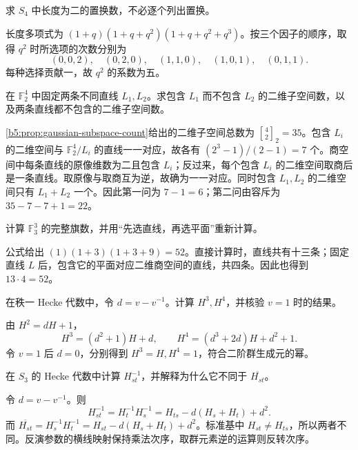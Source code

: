 \begin{exercise}\label{b5:ex:A-length-four-coefficient}
	求 \(S_4\) 中长度为二的置换数，不必逐个列出置换。
\end{exercise}
\begin{solution}
	长度多项式为 \((1+q)(1+q+q^2)(1+q+q^2+q^3)\)。按三个因子的顺序，取得 \(q^2\) 时所选项的次数分别为
	\[
		(0,0,2),\quad(0,2,0),\quad(1,1,0),\quad(1,0,1),\quad(0,1,1).
	\]
	每种选择贡献一，故 \(q^2\) 的系数为五。
\end{solution}

\begin{exercise}\label{b5:ex:A-gaussian-four-two}
	在 \(\mathbb F_2^4\) 中固定两条不同直线 \(L_1,L_2\)。求包含 \(L_1\) 而不包含 \(L_2\) 的二维子空间数，以及两条直线都不包含的二维子空间数。
\end{exercise}
\begin{solution}
	\cref{b5:prop:gaussian-subspace-count}给出的二维子空间总数为 \({4\brack2}_2=35\)。包含 \(L_i\) 的二维空间与 \(\mathbb F_2^4/L_i\) 的直线一一对应，故各有 \((2^3-1)/(2-1)=7\) 个。商空间中每条直线的原像维数为二且包含 \(L_i\)；反过来，每个包含 \(L_i\) 的二维空间取商后是一条直线。取原像与取商互为逆，故确为一一对应。同时包含 \(L_1,L_2\) 的二维空间只有 \(L_1+L_2\) 一个。因此第一问为 \(7-1=6\)；第二问由容斥为 \(35-7-7+1=22\)。
\end{solution}

\begin{exercise}\label{b5:ex:A-flag-three}
	计算 \(\mathbb F_3^3\) 的完整旗数，并用“先选直线，再选平面”重新计算。
\end{exercise}
\begin{solution}
	公式给出 \((1)(1+3)(1+3+9)=52\)。直接计算时，直线共有十三条；固定直线 \(L\) 后，包含它的平面对应二维商空间的直线，共四条。因此也得到 \(13\cdot4=52\)。
\end{solution}

\begin{exercise}\label{b5:ex:A-hecke-rank-one-powers}
	在秩一 Hecke 代数中，令 \(d=v-v^{-1}\)。计算 \(H^3,H^4\)，并核验 \(v=1\) 时的结果。
\end{exercise}
\begin{solution}
	由 \(H^2=dH+1\)，
	\[
		H^3=(d^2+1)H+d,\qquad H^4=(d^3+2d)H+d^2+1.
	\]
	令 \(v=1\) 后 \(d=0\)，分别得到 \(H^3=H,H^4=1\)，符合二阶群生成元的幂。
\end{solution}

\begin{exercise}\label{b5:ex:A-hecke-inverse}
	在 \(S_3\) 的 Hecke 代数中计算 \(H_{st}^{-1}\)，并解释为什么它不同于 \(\overline{H_{st}}\)。
\end{exercise}
\begin{solution}
	令 \(d=v-v^{-1}\)。则
	\[
		H_{st}^{-1}=H_t^{-1}H_s^{-1} =H_{ts}-d(H_s+H_t)+d^2.
	\]
	而 \(\overline{H_{st}}=H_s^{-1}H_t^{-1} =H_{st}-d(H_s+H_t)+d^2\)。标准基中 \(H_{st}\ne H_{ts}\)，所以两者不同。反演参数的横线映射保持乘法次序，取群元素逆的运算则反转次序。
\end{solution}

